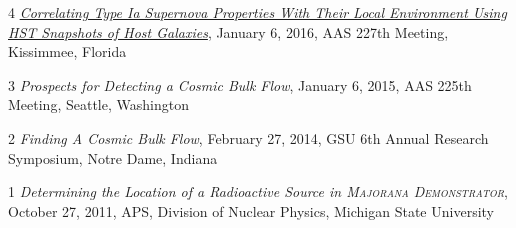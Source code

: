 \documentclass[margin]{res}
\begin{document}
\begin{resume}
\hangindent=15pt {\footnotesize \textcolor{light-gray}{4}} \href{https://ui.adsabs.harvard.edu/#abs/2016AAS...22723711R/abstract}{{\sl Correlating Type Ia Supernova Properties With Their Local Environment Using HST Snapshots of Host Galaxies}}, January 6, 2016, AAS 227th Meeting, Kissimmee, Florida
\vspace{-12pt}

\hangindent=15pt {\footnotesize \textcolor{light-gray}{3}} 
{\sl Prospects for Detecting a Cosmic Bulk Flow},  January 6, 2015, AAS 225th Meeting, Seattle, Washington 
\vspace{-12pt}

\hangindent=15pt {\footnotesize \textcolor{light-gray}{2}} 
{\sl Finding A Cosmic Bulk Flow}, February 27, 2014, GSU 6th Annual Research Symposium, Notre Dame, Indiana
\vspace{-12pt}

\hangindent=15pt {\footnotesize \textcolor{light-gray}{1}} 
{\sl Determining the Location of a Radioactive Source in \textsc{Majorana Demonstrator}}, October 27, 2011, APS, Division of Nuclear Physics, Michigan State University 


\begin{comment}
\href{https://ui.adsabs.harvard.edu/#abs/2017AAS...22943402R/abstract}{{\sl Correlations Between Hubble Residuals and Local Stellar Populations}} \hfill {\bf January 7, 2017} \\
\textit{of Type Ia Supernovae}\\
AAS 229th Meeting, Grapevine, Texas

\href{https://ui.adsabs.harvard.edu/#abs/2016AAS...22723711R/abstract}{{\sl Correlating Type Ia Supernova Properties With Their Local}} \hfill {\bf January 6, 2016} \\
\textit{Environment Using HST Snapshots of Host Galaxies} \\
AAS 227th Meeting, Kissimmee, Florida

{\sl Prospects for Detecting a Cosmic Bulk Flow} \hfill {\bf January 6, 2015}\\
AAS 225th Meeting, Seattle, Washington  

{\sl Finding A Cosmic Bulk Flow}\hfill {\bf February 27, 2014}\\
GSU 6th Annual Research Symposium, Notre Dame 

{\sl Determining the Location of a Radioactive Source in \textsc{Majorana}} \hfill {\bf October 27, 2011}\\
\textit{\textsc{Demonstrator}} \\
APS, Division of Nuclear Physics, Michigan State University 


\end{comment}
\end{resume}
\end{document}
